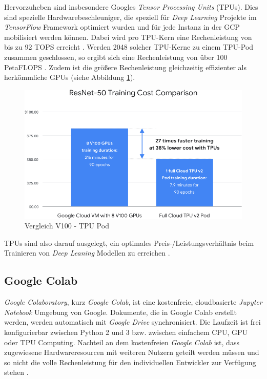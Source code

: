 Hervorzuheben sind insbesondere Googles \textit{Tensor Processing Units} (TPUs). Dies sind spezielle Hardwarebeschleuniger, die speziell für \textit{Deep Learning} Projekte im \textit{TensorFlow} Framework optimiert wurden und für jede Instanz in der GCP mobilisiert werden können. Dabei wird pro TPU-Kern eine Rechenleistung von bis zu 92 TOPS erreicht \cite{HaraldBogeholz.20170406}. Werden 2048 solcher TPU-Kerne zu einem TPU-Pod zusammen geschlossen, so ergibt sich eine Rechenleistung von über 100 PetaFLOPS \cite{GoogleCloud.20200209}. Zudem ist die größere Rechenleistung gleichzeitig effizienter als herkömmliche GPUs (siehe Abbildung \ref{tpu}).

\begin{figure}[ht]
	\begin{center}
		\includegraphics[width=14cm]{Bilder/tpu_comparison.png} 
		\caption[Vergleich V100 - TPU Pod]{Vergleich V100 - TPU Pod \cite{GoogleCloud.20200209b}}
		\label{tpu}
	\end{center}
\end{figure}

TPUs sind also darauf ausgelegt, ein optimales Preis-/Leistungsverhältnis beim Trainieren von \textit{Deep Leaning} Modellen zu erreichen \cite{GoogleCloudPlatform.20200314}.

\subsection*{Google Colab}

\textit{Google Colaboratory}, kurz \textit{Google Colab}, ist eine kostenfreie, cloudbasierte \textit{Jupyter Notebook} Umgebung von Google. Dokumente, die in Google Colab erstellt werden, werden automatisch mit \textit{Google Drive} synchronisiert. Die Laufzeit ist frei konfigurierbar zwischen Python 2 und 3 bzw. zwischen einfachem CPU, GPU oder TPU Computing. Nachteil an dem kostenfreien \textit{Google Colab} ist, dass zugewiesene Hardwareresourcen mit weiteren Nutzern geteilt werden müssen und so nicht die volle Rechenleistung für den individuellen Entwickler zur Verfügung stehen \cite{GoogleColaboratory.20200314}. 

